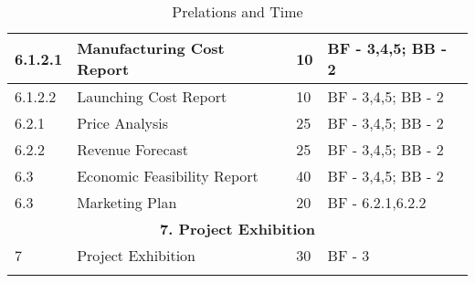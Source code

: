 \begin{longtable}{ | p{1.3cm} | p{7cm} | p{3cm} | p{3.5cm} |}
6.1.2.1 & Manufacturing Cost Report & 10 & BF - 3,4,5; BB - 2 \\ \hline
6.1.2.2 & Launching Cost Report  & 10 & BF - 3,4,5; BB - 2 \\ \hline
6.2.1 & Price Analysis & 25 & BF - 3,4,5; BB - 2 \\ \hline
6.2.2 & Revenue Forecast & 25 & BF - 3,4,5; BB - 2 \\ \hline
6.3 & Economic Feasibility Report & 40 & BF - 3,4,5; BB - 2  \\ \hline
6.3 & Marketing Plan & 20 & BF - 6.2.1,6.2.2 \\ \hline
\multicolumn{4}{|c|}{\textbf{7. Project Exhibition}} \\ \hline
7 & Project Exhibition &30 & BF - 3 \\ \hline
\caption{Prelations and Time} \\
\end{longtable}